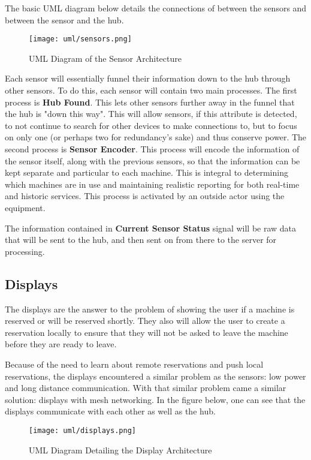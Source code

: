 \documentclass[PPFS.tex]{template/subfiles}
\begin{document}
The basic UML diagram below details the connections of between the sensors and between the sensor and the hub.

\begin{figure}[H]
    \centering
    \texttt{[image: uml/sensors.png]}
    \caption{UML Diagram of the Sensor Architecture}
\end{figure}

Each sensor will essentially funnel their information down to the hub through other sensors. To do this, each sensor will contain two main processes. The first process is \textbf{Hub Found}. This lets other sensors further away in the funnel that the hub is "down this way". This will allow sensors, if this attribute is detected, to not continue to search for other devices to make connections to, but to focus on only one (or perhaps two for redundancy's sake) and thus conserve power. The second process is \textbf{Sensor Encoder}. This process will encode the information of the sensor itself, along with the previous sensors, so that the information can be kept separate and particular to each machine. This is integral to determining which machines are in use and maintaining realistic reporting for both real-time and historic services. This process is activated by an outside actor using the equipment.

The information contained in \textbf{Current Sensor Status} signal will be raw data that will be sent to the hub, and then sent on from there to the server for processing.

\subsection{Displays}

The displays are the answer to the problem of showing the user if a machine is reserved or will be reserved shortly. They also will allow the user to create a reservation locally to ensure that they will not be asked to leave the machine before they are ready to leave.


Because of the need to learn about remote reservations and push local reservations, the displays encountered a similar problem as the sensors: low power and long distance communication. With that similar problem came a similar solution: displays with mesh networking. In the figure below, one can see that the displays communicate with each other as well as the hub.

\begin{figure}[H]
    \centering
    \texttt{[image: uml/displays.png]}
    \caption{UML Diagram Detailing the Display Architecture}
\end{figure}
\end{document}
